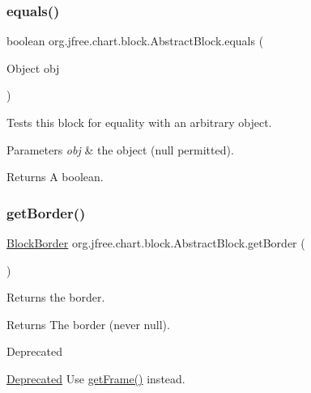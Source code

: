 \subsubsection{\texorpdfstring{equals()}{equals()}}
{\footnotesize\ttfamily boolean org.\+jfree.\+chart.\+block.\+Abstract\+Block.\+equals (\begin{DoxyParamCaption}\item[{Object}]{obj }\end{DoxyParamCaption})}

Tests this block for equality with an arbitrary object.


\begin{DoxyParams}{Parameters}
{\em obj} & the object ({\ttfamily null} permitted).\\
\hline
\end{DoxyParams}
\begin{DoxyReturn}{Returns}
A boolean. 
\end{DoxyReturn}
\mbox{\label{classorg_1_1jfree_1_1chart_1_1block_1_1_abstract_block_abd1516eaf2d394f5df681a58f86f069c}} 
\subsubsection{\texorpdfstring{get\+Border()}{getBorder()}}
{\footnotesize\ttfamily \mbox{\hyperlink{classorg_1_1jfree_1_1chart_1_1block_1_1_block_border}{Block\+Border}} org.\+jfree.\+chart.\+block.\+Abstract\+Block.\+get\+Border (\begin{DoxyParamCaption}{ }\end{DoxyParamCaption})}

Returns the border.

\begin{DoxyReturn}{Returns}
The border (never {\ttfamily null}).
\end{DoxyReturn}
\begin{DoxyRefDesc}{Deprecated}
\item[\mbox{\hyperlink{deprecated__deprecated000031}{Deprecated}}]Use \mbox{\hyperlink{classorg_1_1jfree_1_1chart_1_1block_1_1_abstract_block_a7ac4f2b628be6227111e529d568f162e}{get\+Frame()}} instead. \end{DoxyRefDesc}
\mbox{\label{classorg_1_1jfree_1_1chart_1_1block_1_1_abstract_block_a0fc9bf8ea47727f8c10e6ea4c8fe7622}} 
